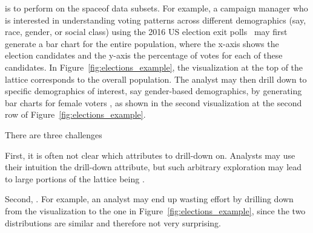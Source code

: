 is to perform 
on the spaceof data subsets.
For example, a campaign manager
who is interested in understanding
voting patterns across different
demographics (say, race, gender, or social class)
using the 2016 US election exit polls~\cite{exitpolls}
may first generate a bar chart for the entire population,
where the x-axis shows the election candidates
and the y-axis  the percentage of votes for each of these candidates.
In Figure~\ref{fig:elections_example},
the visualization at the top of the lattice
corresponds to the overall population.
The analyst may then 
drill down to specific demographics of interest,
say gender-based demographics,
by generating bar charts for female voters ,
as shown in the second visualization
at the second row of Figure~\ref{fig:elections_example}.

There are three challenges 

\smallskip
\noindent
First, it is often not clear which attributes to
drill-down on. Analysts may use their
intuition  the drill-down attribute,
but such arbitrary exploration  may lead to
large portions of the lattice being .

\smallskip
\noindent
Second, .
For example, an analyst may end up
wasting effort by drilling down
from the \blk visualization to the \blkfem one in Figure~\ref{fig:elections_example},
since the two distributions are similar and therefore not very surprising.


